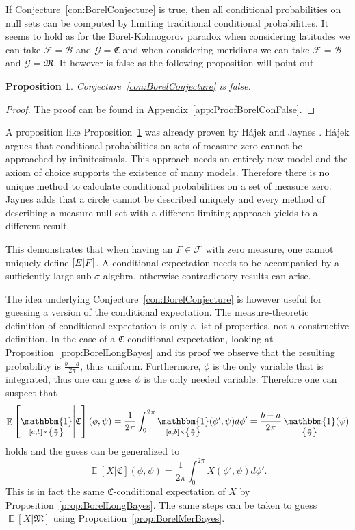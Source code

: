 \documentclass[a4paper]{report}
\theoremstyle{plain}
\newtheorem{proposition}[theorem]{Proposition}
\theoremstyle{definition}
\theoremstyle{remark}
\numberwithin{equation}{chapter}
\let\P\relax
\DeclareMathOperator{\P}{\mathbb{P}}
\DeclareMathOperator{\E}{\mathbb{E}}
\DeclareMathOperator{\1}{\mathbbm{1}}
\newcommand{\F}{\mathcal{F}}
\renewcommand{\G}{\mathcal{G}}
\newcommand{\B}{\mathcal{B}}
\begin{document}
If Conjecture~\ref{con:BorelConjecture} is true, then all conditional probabilities on null sets can be computed by limiting traditional conditional probabilities. It seems to hold as for the Borel-Kolmogorov paradox when considering latitudes we can take $\F=\B$ and $\G=\mathfrak{C}$ and when considering meridians we can take $\F=\B$ and $\G=\mathfrak{M}$. It however is false as the following proposition will point out.

\begin{proposition}\label{prop:BorelConFalse}
Conjecture~\ref{con:BorelConjecture} is false.
\end{proposition}
\begin{proof}
The proof can be found in Appendix~\ref{app:ProofBorelConFalse}.
\end{proof}

A proposition like Proposition~\ref{prop:BorelConFalse} was already proven by Hájek \cite{Hajek03} and Jaynes \cite{Jaynes03}. Hájek argues that conditional probabilities on sets of measure zero cannot be approached by infinitesimals. This approach needs an entirely new model and the axiom of choice supports the existence of many models. Therefore there is no unique method to calculate conditional probabilities on a set of measure zero. Jaynes adds that a circle cannot be described uniquely and every method of describing a measure null set with a different limiting approach yields to a different result.

This demonstrates that when having an $F\in\F$ with zero measure, one cannot uniquely define $\P[E|F]$. A conditional expectation needs to be accompanied by a sufficiently large sub-$\sigma$-algebra, otherwise contradictory results can arise.

The idea underlying Conjecture~\ref{con:BorelConjecture} is however useful for guessing a version of the conditional expectation. The measure-theoretic definition of conditional expectation is only a list of properties, not a constructive definition. In the case of a $\mathfrak{C}$-conditional expectation, looking at Proposition~\ref{prop:BorelLongBayes} and its proof we observe that the resulting probability is $\frac{b-a}{2\pi}$, thus uniform. Furthermore, $\phi$ is the only variable that is integrated, thus one can guess $\phi$ is the only needed variable. Therefore one can suspect that
\begin{equation}
\E\left[\1_{[a,b]\times\left\{\frac{\pi}{2}\right\}}\middle|\mathfrak{C}\right](\phi,\psi)=\frac{1}{2\pi}\int_0^{2\pi}\1_{[a,b]\times\left\{\frac{\pi}{2}\right\}}(\phi',\psi)d\phi'=\frac{b-a}{2\pi}\1_{\left\{\frac{\pi}{2}\right\}}(\psi)
\end{equation}
holds and the guess can be generalized to
\begin{equation}
\E[X|\mathfrak{C}](\phi,\psi)=\frac{1}{2\pi}\int_0^{2\pi}X(\phi',\psi)d\phi'.
\end{equation}
This is in fact the same $\mathfrak{C}$-conditional expectation of $X$ by Proposition~\ref{prop:BorelLongBayes}. The same steps can be taken to guess $\E[X|\mathfrak{M}]$ using Proposition~\ref{prop:BorelMerBayes}.
\end{document}
